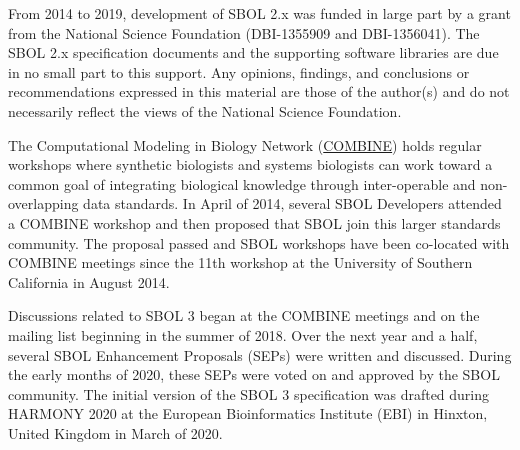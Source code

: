 From 2014 to 2019, development of SBOL 2.x was funded in large part by a grant from the National Science Foundation (DBI-1355909 and DBI-1356041).  The SBOL 2.x specification documents and the supporting software libraries are due in no small part to this support. Any opinions, findings, and conclusions or recommendations expressed in this material are those of the author(s) and do not necessarily reflect the views of the National Science Foundation.

The Computational Modeling in Biology Network (\href{www.co.mbine.org}{COMBINE}) holds regular workshops where synthetic biologists and systems biologists can work toward a common goal of integrating biological knowledge through inter-operable and non-overlapping data standards.  In April of 2014, several SBOL Developers attended a COMBINE workshop and then proposed that SBOL join this larger standards community.  The proposal passed and SBOL workshops have been co-located with COMBINE meetings since the 11th workshop at the University of Southern California in August 2014.

Discussions related to SBOL 3 began at the COMBINE meetings and on the mailing list beginning in the summer of 2018.  Over the next year and a half, several SBOL Enhancement Proposals (SEPs) were written and discussed.  During the early months of 2020, these SEPs were voted on and approved by the SBOL community.  The initial version of the SBOL 3 specification was drafted during HARMONY 2020 at the European Bioinformatics Institute (EBI) in Hinxton, United Kingdom in March of 2020.


